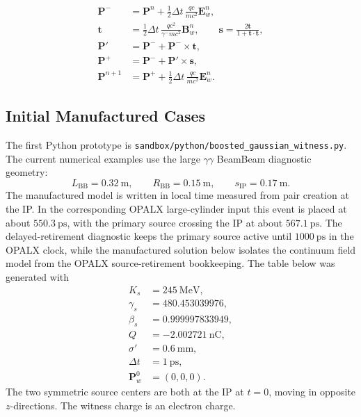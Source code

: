 \documentclass[11pt]{article}
\newcommand{\vect}[1]{\boldsymbol{#1}}
\newcommand{\E}{\vect{E}}
\newcommand{\B}{\vect{B}}
\newcommand{\Pmom}{\vect{P}}
\numberwithin{equation}{section}
\begin{document}
\begin{align}
 \Pmom^- &=
  \Pmom^n
  +
  \frac{1}{2}\Delta t\,\frac{q c}{m c^2}\E_w^n, \\
\vect t &=
  \frac{1}{2}\Delta t\,\frac{q c^2}{\gamma^- m c^2}\B_w^n,
  \qquad
  \vect s =
  \frac{2\vect t}{1+\vect t\cdot\vect t}, \\
\Pmom' &= \Pmom^- + \Pmom^- \times \vect t, \\
\Pmom^+ &= \Pmom^- + \Pmom' \times \vect s, \\
\Pmom^{n+1} &=
  \Pmom^+
  +
  \frac{1}{2}\Delta t\,\frac{q c}{m c^2}\E_w^n .
\end{align}

\subsection{Initial Manufactured Cases}

The first Python prototype is
\texttt{sandbox/python/boosted\_gaussian\_witness.py}.
The current numerical examples use the large \(\gamma\gamma\) BeamBeam
diagnostic geometry:
\begin{equation}
  L_{\mathrm{BB}} = 0.32~\mathrm{m},\qquad
  R_{\mathrm{BB}} = 0.15~\mathrm{m},\qquad
  s_{\mathrm{IP}} = 0.17~\mathrm{m}.
\end{equation}
The manufactured model is written in local time measured from pair creation at
the IP.  In the corresponding OPALX large-cylinder input this event is placed
at about \(550.3~\mathrm{ps}\), with the primary source crossing the IP at
about \(567.1~\mathrm{ps}\).  The delayed-retirement diagnostic keeps the
primary source active until \(1000~\mathrm{ps}\) in the OPALX clock, while the
manufactured solution below isolates the continuum field model from the OPALX
source-retirement bookkeeping.
The table below was generated with
\begin{equation}
\begin{split}
  K_s &= 245~\mathrm{MeV},\\
  \gamma_s &= 480.453039976,\\
  \beta_s &= 0.999997833949,\\
  Q &= -2.002721~\mathrm{nC},\\
  \sigma' &= 0.6~\mathrm{mm},\\
  \Delta t &= 1~\mathrm{ps},\\
  \Pmom_w^0 &= (0,0,0).
\end{split}
\end{equation}
The two symmetric source centers are both at the IP at \(t=0\), moving in
opposite \(z\)-directions.  The witness charge is an electron charge.
\end{document}
